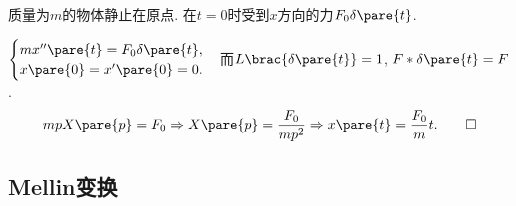 \documentclass[../ComplexVariable.tex]{subfiles}
\begin{document}
\begin{sample}
    \begin{ex}
        质量为$m$的物体静止在原点. 在$t=0$时受到$x$方向的力$F_0\delta\pare{t}$.
    \end{ex}
    \begin{solution}
        $\displaystyle \begin{cases}
            mx''\pare{t} = F_0\delta\pare{t}, \\
            x\pare{0} = x'\pare{0} = 0.
        \end{cases}$而$L\brac{\delta\pare{t}} = 1$, $F*\delta\pare{t} = F$.
        \[ mpX\pare{p} = F_0 \Rightarrow X\pare{p} = \frac{F_0}{mp^2} \Rightarrow x\pare{t} = \frac{F_0}{m}t. \qedhere \]
    \end{solution}
\end{sample}


\subsection{Mellin变换} %
\label{sub:mellin变换}
\end{document}
